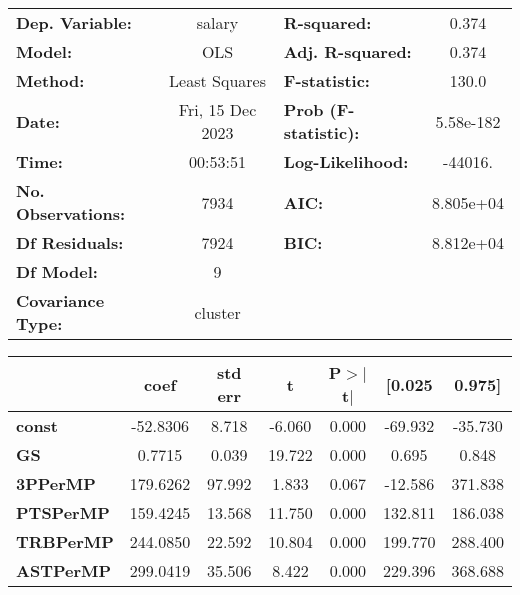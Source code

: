 \begin{center}
\begin{tabular}{lclc}
\toprule
\textbf{Dep. Variable:}    &      salary      & \textbf{  R-squared:         } &     0.374   \\
\textbf{Model:}            &       OLS        & \textbf{  Adj. R-squared:    } &     0.374   \\
\textbf{Method:}           &  Least Squares   & \textbf{  F-statistic:       } &     130.0   \\
\textbf{Date:}             & Fri, 15 Dec 2023 & \textbf{  Prob (F-statistic):} & 5.58e-182   \\
\textbf{Time:}             &     00:53:51     & \textbf{  Log-Likelihood:    } &   -44016.   \\
\textbf{No. Observations:} &        7934      & \textbf{  AIC:               } & 8.805e+04   \\
\textbf{Df Residuals:}     &        7924      & \textbf{  BIC:               } & 8.812e+04   \\
\textbf{Df Model:}         &           9      & \textbf{                     } &             \\
\textbf{Covariance Type:}  &     cluster      & \textbf{                     } &             \\
\bottomrule
\end{tabular}
\begin{tabular}{lcccccc}
                       & \textbf{coef} & \textbf{std err} & \textbf{t} & \textbf{P$> |$t$|$} & \textbf{[0.025} & \textbf{0.975]}  \\
\midrule
\textbf{const}         &     -52.8306  &        8.718     &    -6.060  &         0.000        &      -69.932    &      -35.730     \\
\textbf{GS}            &       0.7715  &        0.039     &    19.722  &         0.000        &        0.695    &        0.848     \\
\textbf{3PPerMP}       &     179.6262  &       97.992     &     1.833  &         0.067        &      -12.586    &      371.838     \\
\textbf{PTSPerMP}      &     159.4245  &       13.568     &    11.750  &         0.000        &      132.811    &      186.038     \\
\textbf{TRBPerMP}      &     244.0850  &       22.592     &    10.804  &         0.000        &      199.770    &      288.400     \\
\textbf{ASTPerMP}      &     299.0419  &       35.506     &     8.422  &         0.000        &      229.396    &      368.688     \\

\end{tabular}
\end{center}
